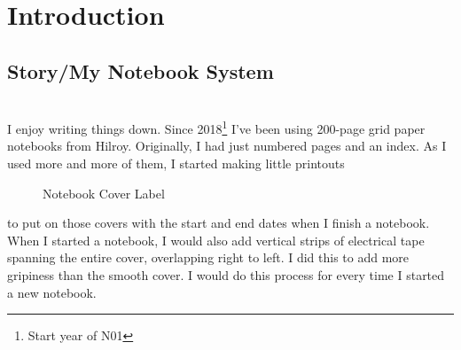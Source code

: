 \documentclass{article}
\title{\myTitle}
\author{\myAuthor}
\date{\myDateUpdated}
\begin{document}
\maketitle              %
\begin{abstract}
	The \texttt{npage} package \\
\end{abstract}
\tableofcontents        %
\listoftodos			%
\hypersetup{linkcolor=blue} %
\newpage                %
\flushleft
\setlength{\parindent}{20pt}

\section{Introduction}

\subsection{Story/My Notebook System}
 \\
I enjoy writing things down. Since 2018\footnote{Start year of N01}
I've been using 200-page grid paper notebooks from Hilroy. Originally, I had
just numbered pages and an index. As I used more and more of them, I started
making little printouts



\begin{figure}[h!]
	\caption{Notebook Cover Label}
	\centering
	\label{fig:my_label}
\end{figure}

to put on those covers with the start and end dates when I finish a
notebook. When I started a notebook, I would also add vertical strips of
electrical tape spanning the entire cover, overlapping right to left. I did
this to add more gripiness than the smooth cover. I would do this process for every time I started a new notebook.
\end{document}
